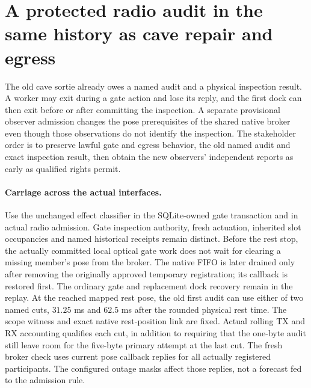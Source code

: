 \documentclass{article}
\begin{document}
\section*{A protected radio audit in the same history as cave repair and egress}
The old cave sortie already owes a named audit and a physical
inspection result. A worker may exit during a gate action and
lose its reply, and the first dock can then exit before or after
committing the inspection. A separate provisional observer
admission changes the pose prerequisites of the shared native
broker even though those observations do not identify the
inspection. The stakeholder order is to preserve lawful gate and
egress behavior, the old named audit and exact inspection result,
then obtain the new observers' independent reports as early
as qualified rights permit.

\paragraph{Carriage across the actual interfaces.}
Use the unchanged effect classifier in the SQLite-owned gate
transaction and in actual radio admission. Gate inspection
authority, fresh actuation, inherited slot occupancies and named
historical receipts remain distinct. Before the rest stop,
the actually committed local optical gate work does not wait for
clearing a missing member's pose from the broker. The native FIFO
is later drained only after removing the originally approved
temporary registration; its callback is restored first. The
ordinary gate and replacement dock recovery remain in the replay.
At the reached mapped rest pose, the old first audit can use
either of two named cuts, \(31.25\) ms and \(62.5\) ms after
the rounded physical rest time. The scope witness and exact native
rest-position link are fixed. Actual rolling TX and RX accounting
qualifies each cut, in addition to requiring that the one-byte
audit still leave room for the five-byte primary attempt at
the last cut. The fresh broker check uses current pose callback
replies for all actually registered participants. The configured
outage masks affect those replies, not a forecast fed to the
admission rule.
\end{document}
